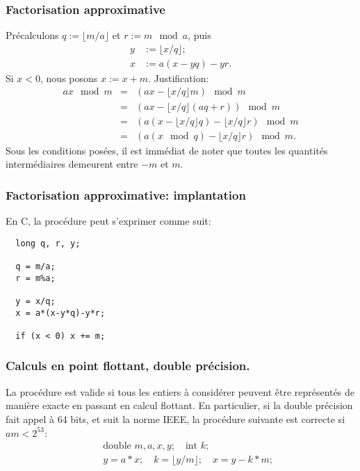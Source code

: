 \documentclass[t,usepdftitle=false]{beamer}
\begin{document}
\begin{frame}
\frametitle{Factorisation approximative}

Précalculons ${q} := \lfloor m/a \rfloor$ et ${r} := m\mod a$, puis
\begin{align*}
  y &:= \lfloor x / q \rfloor; \\
  x &:= a (x - yq) - yr.
\end{align*}
Si $x < 0$, nous posons $x := x + m$. Justification:
\begin{eqnarray*}
  a x \mod m &=&  (ax - \lfloor x/q\rfloor m) \mod m \\
      &=&  (ax - \lfloor x/q\rfloor (a q + r)) \mod m \\
      &=&  (a (x - \lfloor x/q\rfloor q) - \lfloor x/q\rfloor r) \mod m \\
      &=&  (a (x \mod q) - \lfloor x/q\rfloor r) \mod m.
\end{eqnarray*}
Sous les conditions posées, il est immédiat de noter que toutes les quantités intermédiaires demeurent entre $-m$ et $m$.
\end{frame}

\begin{frame}[fragile]
\frametitle{Factorisation approximative: implantation}

En C, la procédure peut s'exprimer comme suit:
\begin{footnotesize}
\begin{verbatim}
  long q, r, y;

  q = m/a;
  r = m%a;

  y = x/q;
  x = a*(x-y*q)-y*r;

  if (x < 0) x += m;
\end{verbatim}
\end{footnotesize}
\end{frame}

\begin{frame}[fragile]
\frametitle{Calculs en point flottant, double précision.}

La procédure est valide si tous les entiers à considérer peuvent être représentés de manière exacte en passant en calcul flottant.
En particulier, si la double précision fait appel à 64 bits, et suit
la norme IEEE, la procédure suivante est correcte si $am < 2^{53}$:
\begin {eqnarray*}
   && \mbox{double } m, a, x, y; \quad  \mbox{int } k; \\
   && y = a * x; \quad
    k = \lfloor y / m \rfloor; \quad
    x = y - k * m;
\end {eqnarray*}
\end{frame}
\end{document}
